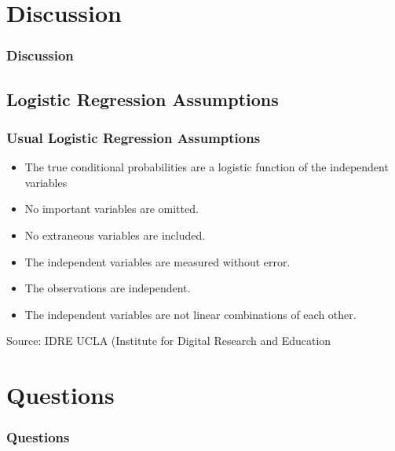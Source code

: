 \documentclass{beamer}
\begin{document}
\section{Discussion}
\begin{frame}
\frametitle{Discussion}
\end{frame}

\subsection{Logistic Regression Assumptions}
\begin{frame}
\frametitle{Usual Logistic Regression Assumptions}
\begin{itemize}
\item The true conditional probabilities are a logistic function of the independent variables
\item No important variables are omitted.
\item No extraneous variables are included.
\item The independent variables are measured without error.
\item The observations are independent.
\item The independent variables are not linear combinations of each other.
\end{itemize}

\tiny{Source: IDRE UCLA (Institute for Digital Research and Education}
\end{frame}



\section{Questions}
\begin{frame}
\frametitle{Questions}
\begin{center}

\end{center}



\end{frame}

 
\end{document}
